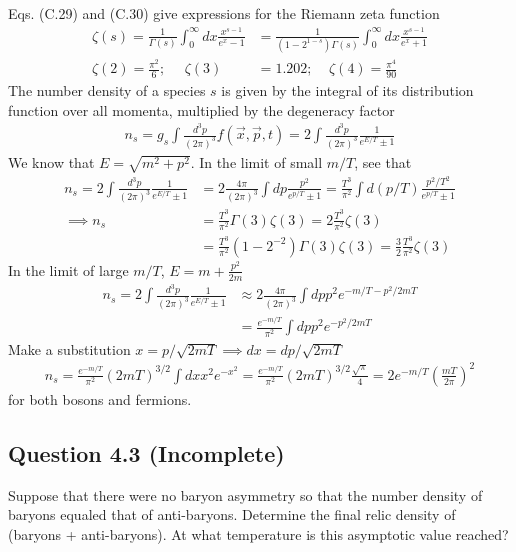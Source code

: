 \documentclass[11pt]{article}
\begin{document}
Eqs. (C.29) and (C.30) give expressions for the Riemann zeta function 
\begin{align*}
    \zeta(s) = \frac{1}{\Gamma(s)} \int_0^\infty dx \frac{x^{s-1}}{e^x - 1} &= \frac{1}{(1-2^{1-s})\Gamma(s)} \int_0^\infty dx \frac{x^{s-1}}{e^x + 1}  \\
    \zeta(2) = \frac{\pi^2}{6}; ~~~~~~ \zeta(3) &= 1.202; ~~~~~ \zeta(4) = \frac{\pi^4}{90}
\end{align*}
The number density of a species $s$ is given by the integral of its distribution function over all momenta, multiplied by the degeneracy factor
\begin{align*}
    n_s = g_s \int \frac{d^3p}{(2\pi)^3} f(\vec{x}, \vec{p}, t) = 2 \int \frac{d^3p}{(2\pi)^3} \frac{1}{e^{E/T} \pm 1} 
\end{align*}
We know that $E = \sqrt{m^2 + p^2}$. In the limit of small $m/T$, see that 
\begin{align*}
    n_s = 2 \int \frac{d^3p}{(2\pi)^3} \frac{1}{e^{E/T} \pm 1}  &= 2 \frac{4\pi}{(2\pi)^3} \int dp \frac{p^2}{e^{p/T} \pm 1} = \frac{T^3}{\pi^2} \int d(p/T) \frac{p^2/T^2}{e^{p/T} \pm 1} \\
    \implies n_s &= \frac{T^3}{\pi^2} \Gamma(3)\zeta(3) \tag{bosons} = 2 \frac{T^3}{\pi^2} \zeta(3) \\
    &= \frac{T^3}{\pi^2 } (1 - 2^{-2}) \Gamma(3) \zeta(3) = \frac{3}{2} \frac{T^3}{\pi^2} \zeta(3) \tag{fermions}
\end{align*}
In the limit of large $m/T$, $E = m + \frac{p^2}{2m}$
\begin{align*}
    n_s = 2 \int \frac{d^3p}{(2\pi)^3} \frac{1}{e^{E/T} \pm 1}  &\approx 2 \frac{4\pi}{(2\pi)^3} \int dp p^2 e^{-m/T - p^2/2mT} \\
    &= \frac{e^{-m/T}}{\pi^2} \int dp p^2e^{-p^2/2mT}
\end{align*}
Make a substitution $x = p/\sqrt{2mT} \implies dx = dp / \sqrt{2mT}$  
\begin{align*}
    n_s = \frac{e^{-m/T}}{\pi^2} (2mT)^{3/2} \int dx x^2 e^{-x^2} = \frac{e^{-m/T}}{\pi^2}(2mT)^{3/2} \frac{\sqrt{\pi}}{4} = 2e^{-m/T} \left( \frac{mT }{2\pi} \right)^2
\end{align*}
for both bosons and fermions. 

\subsection{Question 4.3 (Incomplete)}
Suppose that there were no baryon asymmetry so that the number density of baryons equaled that of anti-baryons. Determine the final relic density of (baryons + anti-baryons). At what temperature is this asymptotic value reached?
\end{document}
